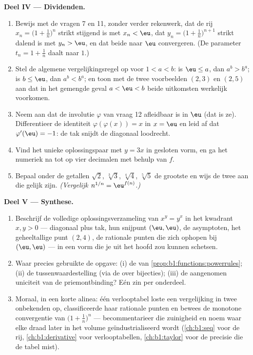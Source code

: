 \begin{problem}
\medskip
\noindent\textbf{Deel IV --- Dividenden.}
\begin{enumerate}[resume]
  \item Bewijs met de vragen 7 en 11, zonder verder rekenwerk, dat de
        rij $x_n = \bigl(1 + \frac1n\bigr)^n$ strikt stijgend is met
        $x_n < \eu$, dat $y_n = \bigl(1 + \frac1n\bigr)^{n+1}$ strikt
        dalend is met $y_n > \eu$, en dat beide naar $\eu$ convergeren.
        (De parameter $t_n = 1 + \frac1n$ daalt naar $1$.)
  \item Stel de algemene vergelijkingsregel op voor $1 < a < b$: is
        $\eu \leq a$, dan $a^b > b^a$; is $b \leq \eu$, dan $a^b <
        b^a$; en toon met de twee voorbeelden $(2, 3)$ en $(2, 5)$ aan
        dat in het gemengde geval $a < \eu < b$ beide uitkomsten
        werkelijk voorkomen.
  \item Neem aan dat de involutie $\varphi$ van vraag 12 afleidbaar is
        in $\eu$ (dat is ze). Differentieer de identiteit
        $\varphi(\varphi(x)) = x$ in $x = \eu$ en leid af dat
        $\varphi'(\eu) = -1$: de tak snijdt de diagonaal loodrecht.
  \item Vind het unieke oplossingspaar met $y = 3x$ in gesloten vorm,
        en ga het numeriek na tot op vier decimalen met behulp van $f$.
  \item Bepaal onder de getallen $\sqrt2$, $\sqrt[3]3$, $\sqrt[4]4$,
        $\sqrt[5]5$ de grootste en wijs de twee aan die gelijk zijn.
        \emph{(Vergelijk $n^{1/n} = \eu^{f(n)}$.)}
\end{enumerate}

\medskip
\noindent\textbf{Deel V --- Synthese.}
\begin{enumerate}[resume]
  \item Beschrijf de volledige oplossingsverzameling van $x^y = y^x$ in
        het kwadrant $x, y > 0$ --- diagonaal plus tak, hun snijpunt
        $(\eu, \eu)$, de asymptoten, het geheeltallige punt $(2, 4)$,
        de rationale punten die zich ophopen bij $(\eu, \eu)$ --- in
        een vorm die je uit het hoofd zou kunnen schetsen.
  \item Waar precies gebruikte de opgave: (i) de 
        van \cref{prop:b1:functions:powerrules}; (ii) de
        tussenwaardestelling (via de  over bijecties); (iii)
        de aangenomen uniciteit van de priemontbinding? Eén zin per
        onderdeel.
  \item Moraal, in een korte alinea: één verlooptabel loste een
        vergelijking in twee onbekenden op, classificeerde haar
        rationale punten en bewees de monotone convergentie van
        $\bigl(1 + \frac1n\bigr)^n$ --- becommentarieer die zuinigheid
        en noem waar elke draad later in het volume geïndustrialiseerd
        wordt (\cref{ch:b1:seq} voor de rij, \cref{ch:b1:derivative}
        voor verlooptabellen, \cref{ch:b1:taylor} voor de precisie die
        de tabel mist).
\end{enumerate}
\end{problem}
